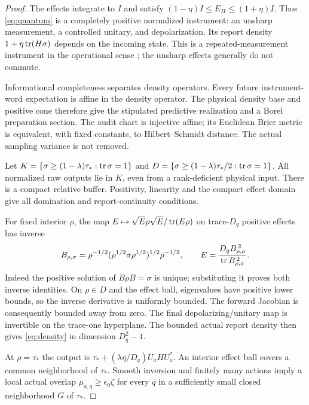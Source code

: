 \begin{proof}
The effects integrate to $I$ and satisfy $(1-\eta)I\le E_H\le(1+\eta)I$. Thus \eqref{eq:quantum} is a completely positive normalized instrument: an unsharp measurement, a controlled unitary, and depolarization. Its report density $1+\eta\operatorname{tr}(H\sigma)$ depends on the incoming state. This is a repeated-measurement instrument in the operational sense \cite{DL1970}; the unsharp effects generally do not commute.

Informational completeness separates density operators. Every future instrument-word expectation is affine in the density operator. The physical density base and positive cone therefore give the stipulated predictive realization and a Borel preparation section. The audit chart is injective affine; its Euclidean Brier metric is equivalent, with fixed constants, to Hilbert--Schmidt distance. The actual sampling variance is not removed.

Let $K=\{\sigma\ge(1-\lambda)\tau_*:\operatorname{tr}\sigma=1\}$ and $D=\{\sigma\ge(1-\lambda)\tau_*/2:\operatorname{tr}\sigma=1\}$. All normalized raw outputs lie in $K$, even from a rank-deficient physical input. There is a compact relative buffer. Positivity, linearity and the compact effect domain give all domination and report-continuity conditions.

For fixed interior $\rho$, the map $E\mapsto\sqrt E\rho\sqrt E/\operatorname{tr}(E\rho)$ on trace-$D_q$ positive effects has inverse
\[
 B_{\rho,\sigma}=\rho^{-1/2}(\rho^{1/2}\sigma\rho^{1/2})^{1/2}\rho^{-1/2},
 \qquad E=\frac{D_qB_{\rho,\sigma}^{\,2}}{\operatorname{tr} B_{\rho,\sigma}^{\,2}}.
\]
Indeed the positive solution of $B\rho B=\sigma$ is unique; substituting it proves both inverse identities. On $\rho\in D$ and the effect ball, eigenvalues have positive lower bounds, so the inverse derivative is uniformly bounded. The forward Jacobian is consequently bounded away from zero. The final depolarizing/unitary map is invertible on the trace-one hyperplane. The bounded actual report density then gives \eqref{eq:density} in dimension $D_q^2-1$.

At $\rho=\tau_*$ the output is $\tau_*+(\lambda\eta/D_q)U_aHU_a^*$. An interior effect ball covers a common neighborhood of $\tau_*$. Smooth inversion and finitely many actions imply a local actual overlap $\mu_{a,q}\ge\epsilon_0\zeta$ for every $q$ in a sufficiently small closed neighborhood $G$ of $\tau_*$.


\end{proof}

